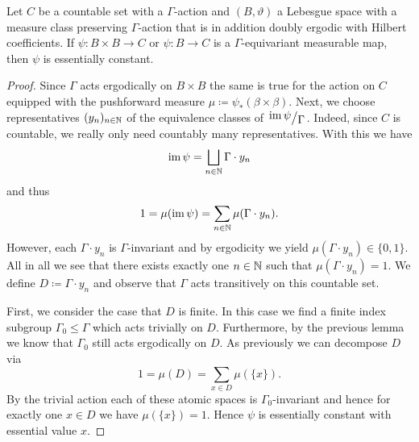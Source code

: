 \begin{lemma}[{\cite[Lem. 4.4]{MR3509968}}]
  \label{lem:4.4}
  Let \(C\) be a countable set with a \(\Gamma\)-action and \((B, \vartheta)\) a Lebesgue space with a measure class preserving \(\Gamma\)-action that is in addition doubly ergodic with Hilbert coefficients. If \(\psi \colon B \times B \to C\) or \(\psi \colon B \to C\) is a \(\Gamma\)-equivariant measurable map, then \(\psi\) is essentially constant.
\end{lemma}

\begin{proof}
  Since \(\Gamma\) acts ergodically on \(B \times B\) the same is true for the action on \(C\) equipped with the pushforward measure \(\mu \coloneqq \psi_\ast(\beta \times \beta)\). Next, we choose representatives \((y_n)_{n \in \mathbb{N}}\) of the equivalence classes of \(\quot{\im \psi}{\Gamma}\). Indeed, since \(C\) is countable, we really only need countably many representatives. With this we have
  \[
    \operatorname{im} \psi = \bigsqcup_{n \in \mathbb{N}} \Gamma \cdot y_n
  \]
  and thus
  \[
    1 = \mu(\operatorname{im} \psi) = \sum_{n \in \mathbb{N}} \mu(\Gamma \cdot y_n).
  \]
  However, each \(\Gamma \cdot y_n\) is \(\Gamma\)-invariant and by ergodicity we yield \(\mu(\Gamma \cdot y_n) \in \{0,1\}\). All in all we see that there exists exactly one \(n \in \mathbb{N}\) such that \(\mu(\Gamma \cdot y_n) = 1\). We define \(D \coloneqq \Gamma \cdot y_n\) and observe that \(\Gamma\) acts transitively on this countable set.

  First, we consider the case that \(D\) is finite. In this case we find a finite index subgroup \(\Gamma_0 \leq \Gamma\) which acts trivially on \(D\). Furthermore, by the previous lemma we know that \(\Gamma_0\) still acts ergodically on \(D\). As previously we can decompose \(D\) via
  \[
    1 = \mu(D) = \sum_{x \in D} \mu(\{x\}).
  \]
  By the trivial action each of these atomic spaces is \(\Gamma_0\)-invariant and hence for exactly one \(x \in D\) we have \(\mu(\{x\}) = 1\). Hence \(\psi\) is essentially constant with essential value \(x\).


\end{proof}
